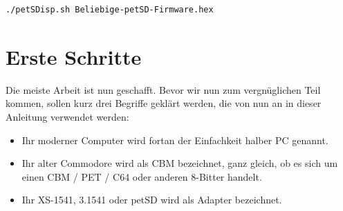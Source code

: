 \documentclass[10pt,a4paper]{scrartcl}		%
\begin{document}
\begin{verbatim}
./petSDisp.sh Beliebige-petSD-Firmware.hex
\end{verbatim}

\clearpage
\section{Erste Schritte}
Die meiste Arbeit ist nun geschafft. Bevor wir nun zum vergnüglichen
Teil kommen, sollen kurz drei Begriffe geklärt werden, die von nun
an in dieser Anleitung verwendet werden:
\begin{itemize}
\item Ihr moderner Computer wird fortan der Einfachkeit halber 
	\glqq{}PC\grqq{} genannt.
\item Ihr alter Commodore wird als 
\glqq{}CBM\grqq{} bezeichnet, ganz gleich, ob es sich um einen CBM / PET / C64 
oder anderen 8-Bitter handelt.
\item Ihr XS-1541, 3.1541 oder petSD wird 
als \glqq{}Adapter\grqq{} bezeichnet.
\end{itemize}
\end{document}
